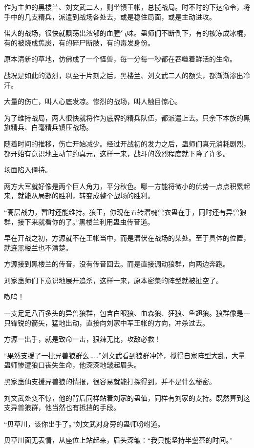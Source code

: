 \begin{this_body}
作为主帅的黑楼兰、刘文武二人，则坐镇王帐，总揽战局。时不时的下达命令，将手中的几支精兵，派遣到战场各处去，或是稳住局面，或是主动进攻。

偌大的战场，很快就飘荡出浓郁的血腥气味。蛊师们不断倒下，有的被冻成冰棍，有的被烧成焦炭，有的碎尸断肢，有的毒发身份。

原本清新的草地，仿佛成了一个怪兽，每一分每一秒都在吞噬着鲜活的生命。

战况是如此的激烈，以至于片刻之后，黑楼兰、刘文武二人的额头，都渐渐渗出冷汗。

大量的伤亡，叫人心底发凉。惨烈的战场，叫人触目惊心。

为了维持战局，两人很快就将作为底牌的精兵队伍，都派遣上去。只余下本族的黑旗精兵、白毫精兵镇压战场。

随着时间的推移，伤亡开始减少。经过开战初的发力之后，蛊师们真元消耗剧烈，都开始有意识地主动节约真元，这样一来，战斗的激烈程度就下降了许多。

场面陷入僵持。

两方大军就好像是两个巨人角力，平分秋色。哪一方能将微小的优势一点点积累起来，就能从局部的胜利，转变成整个战场的胜利。

“高层战力，暂时还能维持。狼王，你现在五转潜魂兽衣蛊在手，同时还有异兽狼群，接下来就看你的了。”黑楼兰利用蛊虫传音道。

早在开战之初，方源就不在王帐当中，而是潜伏在战场的某处。至于具体的位置，就连黑楼兰也不清楚。

方源接到黑楼兰的传音，没有传音回去。而是直接调动狼群，向两边奔跑。

刘家蛊师们下意识地展开追杀，这样一来，原本密集的阵型就被扯空了。

嗷呜！

一支足足八百多头的异兽狼群，包含白眼狼、血森狼、狂狼、鱼翅狼。狼群像是一只锋锐的箭矢，猛地出动，直接向刘家中军王帐的方向，冲杀过去。

方源一出手，就是致命一击，狠辣无比，攻敌必救！

“果然支援了一批异兽狼群么……”刘文武看到狼群冲锋，搅得自家阵型大乱，大量蛊师惨遭狼口丧失生命，他深深地皱起眉头。

黑家蛊仙支援异兽狼的情报，很容易就能打探得到，并不是什么秘密。

刘文武处变不惊，他的背后同样站着刘家的蛊仙，同样有刘家的支持。既然算到这支异兽狼群，他当然也有抵挡的手段。

“贝草川，该你出手了。”刘文武对身旁的蛊师吩咐道。

贝草川面无表情，从座位上站起来，眉头深皱：“我只能坚持半盏茶的时间。”


\end{this_body}
